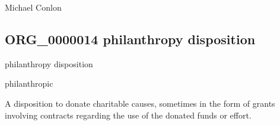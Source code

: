 \documentclass[letterpaper,10pt,english]{sphinxmanual}
\begin{document}
\begin{sphinxShadowBox}

\sphinxAtStartPar
Michael Conlon 
\end{sphinxShadowBox}
\begin{quote}

\ignorespaces \end{quote}


\subsection{ORG\_0000014 \sphinxhyphen{} philanthropy disposition}
\label{\detokenize{doc-ORG_0000014:org-0000014-philanthropy-disposition}}\label{\detokenize{doc-ORG_0000014:index-0}}\label{\detokenize{doc-ORG_0000014::doc}}
\begin{sphinxShadowBox}

\sphinxAtStartPar
philanthropy disposition
\end{sphinxShadowBox}

\begin{sphinxShadowBox}

\sphinxAtStartPar
philanthropic
\end{sphinxShadowBox}

\begin{sphinxShadowBox}

\sphinxAtStartPar
{\hyperref[\detokenize{doc-BFO_0000016::doc}]{}}
\end{sphinxShadowBox}

\begin{sphinxShadowBox}

\sphinxAtStartPar
A disposition to donate charitable causes, sometimes in the form of grants involving contracts regarding the use of the donated funds or effort.
\end{sphinxShadowBox}

\begin{sphinxShadowBox}

\sphinxAtStartPar
{}
\end{sphinxShadowBox}
\end{document}
